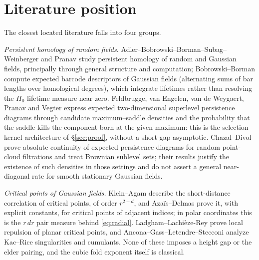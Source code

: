 \section{Literature position}\label{sec:literature}

The closest located literature falls into four groups.

\emph{Persistent homology of random fields.} Adler--Bobrowski--Borman--Subag--Weinberger \cite{ABBSW} and Pranav \cite{Pranav} study persistent homology of random and Gaussian fields, principally through general structure and computation; Bobrowski--Borman \cite{BobrowskiBorman} compute expected barcode descriptors of Gaussian fields (alternating sums of bar lengths over homological degrees), which integrate lifetimes rather than resolving the $H_0$ lifetime measure near zero. Feldbrugge, van Engelen, van de Weygaert, Pranav and Vegter \cite{Feldbrugge} express expected two-dimensional superlevel persistence diagrams through candidate maximum--saddle densities and the probability that the saddle kills the component born at the given maximum: this is the selection-kernel architecture of \S\ref{sec:proof}, without a short-gap asymptotic. Chazal--Divol \cite{ChazalDivol} prove absolute continuity of expected persistence diagrams for random point-cloud filtrations and treat Brownian sublevel sets; their results justify the existence of such densities in those settings and do not assert a general near-diagonal rate for smooth stationary Gaussian fields.

\emph{Critical points of Gaussian fields.} Klein--Agam \cite{KleinAgam} describe the short-distance correlation of critical points, of order $r^{2-d}$, and Azaïs--Delmas \cite{AzaisDelmas} prove it, with explicit constants, for critical points of adjacent indices; in polar coordinates this is the $r\,dr$ pair measure behind \eqref{eq:radial}. Ladgham--Lachièze-Rey \cite{LadghamLR} prove local repulsion of planar critical points, and Ancona--Gass--Letendre--Stecconi \cite{AGLS} analyze Kac--Rice singularities and cumulants. None of these imposes a height gap or the elder pairing, and the cubic fold exponent itself is classical.

